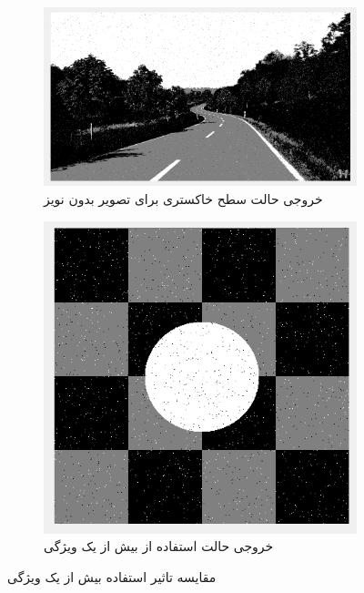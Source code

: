 \documentclass[11.5pt,a4paper]{article}
\begin{document}
\begin{figure}[h]
\center
	\begin{subfigure}{0.4\textwidth}
	\includegraphics[scale=0.2]{Imgs/iter9_Gray_Classification.png}
	\caption{خروجی حالت سطح خاکستری برای تصویر بدون نویز}
	\end{subfigure}
	\begin{subfigure}{0.4\textwidth}
	\includegraphics[scale=0.2]{Imgs/MRF_Iter4_TExp.png}
	\caption{خروجی حالت استفاده از بیش از یک ویژگی}
	\end{subfigure}	
\caption{مقایسه تاثیر استفاده بیش از یک ویژگی}
\label{fig:MultFeat}
\end{figure}


\vfill
\end{document}

